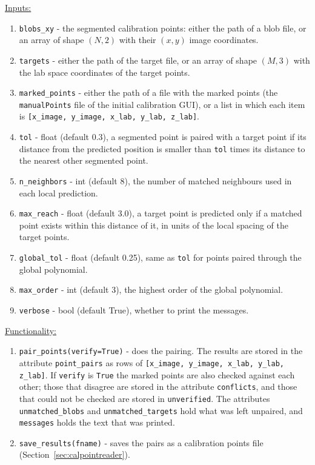 \documentclass[10pt,a4paper]{article}
\begin{document}
\underline{Inputs:}
\begin{enumerate}
	\item \texttt{blobs\_xy} - the segmented calibration points: either the path of a blob file, or an array of shape $(N,2)$ with their $(x,y)$ image coordinates.  
	
	\item \texttt{targets} - either the path of the target file, or an array of shape $(M,3)$ with the lab space coordinates of the target points.
	
	\item \texttt{marked\_points} - either the path of a file with the marked points (the \texttt{manualPoints} file of the initial calibration GUI), or a list in which each item is \texttt{[x\_image, y\_image, x\_lab, y\_lab, z\_lab]}. 
	
	\item \texttt{tol} - float (default 0.3), a segmented point is paired with a target point if its distance from the predicted position is smaller than \texttt{tol} times its distance to the nearest other segmented point. 
	
	\item \texttt{n\_neighbors} - int (default 8), the number of matched neighbours used in each local prediction. 
	
	\item \texttt{max\_reach} - float (default 3.0), a target point is predicted only if a matched point exists within this distance of it, in units of the local spacing of the target points. 
	
	\item \texttt{global\_tol} - float (default 0.25), same as \texttt{tol} for points paired through the global polynomial. 
	
	\item \texttt{max\_order} - int (default 3), the highest order of the global polynomial. 
	
	\item \texttt{verbose} - bool (default True), whether to print the messages. 
\end{enumerate}

\underline{Functionality:}
\begin{enumerate}
	\item \texttt{pair\_points(verify=True)} - does the pairing. The results are stored in the attribute \texttt{point\_pairs} as rows of \texttt{[x\_image, y\_image, x\_lab, y\_lab, z\_lab]}. If \texttt{verify} is \texttt{True} the marked points are also checked against each other; those that disagree are stored in the attribute \texttt{conflicts}, and those that could not be checked are stored in \texttt{unverified}. The attributes \texttt{unmatched\_blobs} and \texttt{unmatched\_targets} hold what was left unpaired, and \texttt{messages} holds the text that was printed.
	
	\item \texttt{save\_results(fname)} - saves the pairs as a calibration points file (Section~\ref{sec:calpointreader}).
\end{enumerate}
\end{document}
